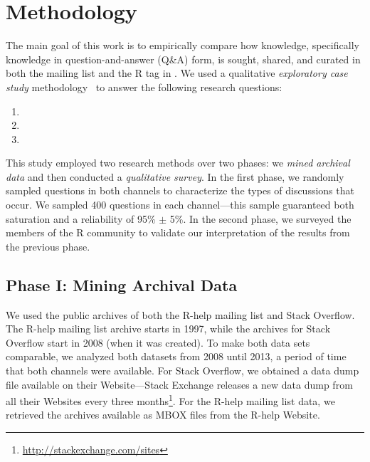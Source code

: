 \section{Methodology}
\label{cha:methodology}

The main goal of this work is to empirically compare how knowledge, specifically knowledge in question-and-answer (Q\&A) form, is sought, shared, and curated in both the \RH mailing list and the R tag in \SO. We used a qualitative \textit{exploratory case study} methodology~\cite{Creswell2009,Runeson2012} to answer the following research questions:
    \begin{enumerate}[label=\bfseries{RQ-\arabic*.},itemsep=3pt, topsep=2pt, leftmargin=3em, parsep=0pt]
        \item \rqa
        \item \rqb
        \item \rqc
     \end{enumerate}


This study employed two research methods over two phases: we \textit{mined archival data} and then conducted a \textit{qualitative survey}. In the first phase, we randomly sampled questions in both channels to characterize the types of discussions that occur. We sampled 400 questions in each channel---this sample guaranteed both saturation and a reliability of 95\% $\pm$ 5\%.  In the second phase, we surveyed the members of the R community to validate our interpretation of the results from the previous phase. %

\subsection{Phase I: Mining Archival Data} 
\label{sec:studyDesign}
We used the public archives of both	the R-help mailing list and Stack Overflow. The R-help mailing list archive starts in 1997, while the archives for Stack Overflow start in 2008 (when it was created).
To make both data sets comparable, we analyzed both datasets from 2008 until 2013, a period of time that both channels were available.
For Stack Overflow, we obtained a data dump file available on their Website---Stack Exchange releases a new data dump from all their Websites every three months\footnote{\url{http://stackexchange.com/sites}}. For the R-help mailing list data, we retrieved the archives available as MBOX files from the R-help Website.

